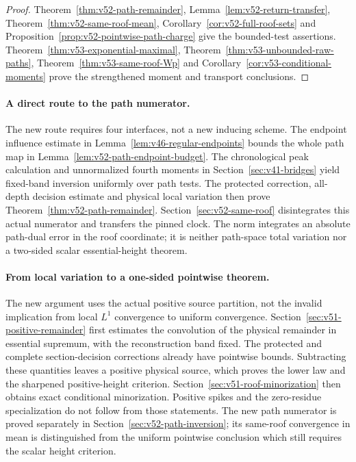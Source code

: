 \documentclass[11pt,reqno]{amsart}
\numberwithin{equation}{section}
\theoremstyle{definition}\newtheorem{definition}[theorem]{Definition}
\theoremstyle{remark}\newtheorem{remark}[theorem]{Remark}
\begin{document}
\begin{proof}
Theorem~\ref{thm:v52-path-remainder}, Lemma~\ref{lem:v52-return-transfer},
Theorem~\ref{thm:v52-same-roof-mean},
Corollary~\ref{cor:v52-full-roof-sets} and
Proposition~\ref{prop:v52-pointwise-path-charge} give the bounded-test
assertions. Theorem~\ref{thm:v53-exponential-maximal},
Theorem~\ref{thm:v53-unbounded-raw-paths},
Theorem~\ref{thm:v53-same-roof-Wp} and
Corollary~\ref{cor:v53-conditional-moments} prove the strengthened
moment and transport conclusions.
\end{proof}

\paragraph{A direct route to the path numerator.}
The new route requires four interfaces, not a new inducing scheme.
The endpoint influence estimate in
Lemma~\ref{lem:v46-regular-endpoints} bounds the whole path map in
Lemma~\ref{lem:v52-path-endpoint-budget}. The chronological peak
calculation and unnormalized fourth moments in
Section~\ref{sec:v41-bridges} yield fixed-band inversion uniformly over
path tests. The protected correction, all-depth decision estimate and
physical local variation then prove
Theorem~\ref{thm:v52-path-remainder}. Section~\ref{sec:v52-same-roof}
disintegrates this actual numerator and transfers the pinned clock.
The norm integrates an absolute path-dual error in the roof coordinate;
it is neither path-space total variation nor a two-sided scalar
essential-height theorem.

\paragraph{From local variation to a one-sided pointwise theorem.}
The new argument uses the actual positive source partition, not the
invalid implication from local $L^1$ convergence to uniform convergence.
Section~\ref{sec:v51-positive-remainder} first estimates the convolution
of the physical remainder in essential supremum, with the reconstruction
band fixed. The protected and complete section-decision corrections
already have pointwise bounds. Subtracting these quantities leaves a
positive physical source, which proves the lower law and the sharpened
positive-height criterion. Section~\ref{sec:v51-roof-minorization}
then obtains exact conditional minorization. Positive spikes and the zero-residue specialization do not follow
from those statements. The new path numerator is proved separately in
Section~\ref{sec:v52-path-inversion}; its same-roof convergence in mean
is distinguished from the uniform pointwise conclusion which still
requires the scalar height criterion.
\end{document}
